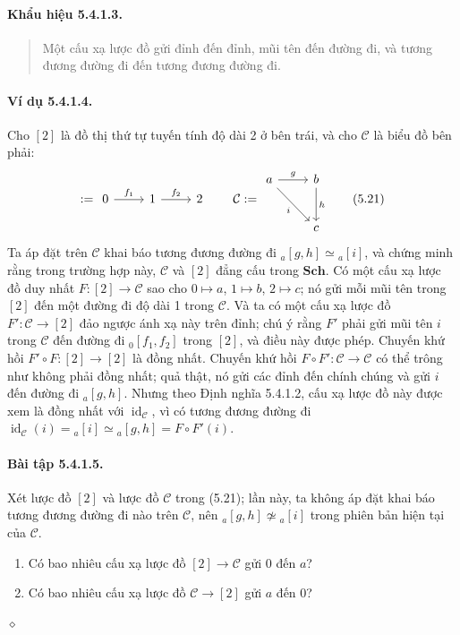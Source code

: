 \paragraph{Khẩu hiệu 5.4.1.3.}\begin{quote}Một cấu xạ lược đồ gửi đỉnh đến đỉnh, mũi tên đến đường đi, và tương đương đường đi đến tương đương đường đi.\end{quote}
\paragraph{Ví dụ 5.4.1.4.} Cho $[2]$ là đồ thị thứ tự tuyến tính độ dài 2 ở bên trái, và cho $\mathcal C$ là biểu đồ bên phải:
\begin{equation*}[2]:=\begin{tikzcd}0\arrow[r,"f_1"]&1\arrow[r,"f_2"]&2\end{tikzcd}\qquad\mathcal C:=\begin{tikzcd}[row sep=large]a\arrow[r,"g"]\arrow[dr,"i"']&b\arrow[d,"h"]\\&c\end{tikzcd}\tag{5.21}\end{equation*}
Ta áp đặt trên $\mathcal C$ khai báo tương đương đường đi ${}_{a}[g,h]\simeq {}_{a}[i]$, và chứng minh rằng trong trường hợp này, $\mathcal C$ và $[2]$ đẳng cấu trong $\mathbf{Sch}$. Có một cấu xạ lược đồ duy nhất $F:[2]\to\mathcal C$ sao cho $0\mapsto a$, $1\mapsto b$, $2\mapsto c$; nó gửi mỗi mũi tên trong $[2]$ đến một đường đi độ dài 1 trong $\mathcal C$. Và ta có một cấu xạ lược đồ $F':\mathcal C\to[2]$ đảo ngược ánh xạ này trên đỉnh; chú ý rằng $F'$ phải gửi mũi tên $i$ trong $\mathcal C$ đến đường đi ${}_{0}[f_1,f_2]$ trong $[2]$, và điều này được phép. Chuyến khứ hồi $F'\circ F:[2]\to[2]$ là đồng nhất. Chuyến khứ hồi $F\circ F':\mathcal C\to\mathcal C$ có thể trông như không phải đồng nhất; quả thật, nó gửi các đỉnh đến chính chúng và gửi $i$ đến đường đi ${}_{a}[g,h]$. Nhưng theo Định nghĩa 5.4.1.2, cấu xạ lược đồ này được xem là đồng nhất với $\operatorname{id}_{\mathcal C}$, vì có tương đương đường đi $\operatorname{id}_{\mathcal C}(i)={}_{a}[i]\simeq {}_{a}[g,h]=F\circ F'(i)$.
\paragraph{Bài tập 5.4.1.5.} Xét lược đồ $[2]$ và lược đồ $\mathcal C$ trong (5.21); lần này, ta không áp đặt khai báo tương đương đường đi nào trên $\mathcal C$, nên ${}_{a}[g,h]\not\simeq {}_{a}[i]$ trong phiên bản hiện tại của $\mathcal C$.
\begin{enumerate}[label=\alph*.]\item Có bao nhiêu cấu xạ lược đồ $[2]\to\mathcal C$ gửi 0 đến $a$?\item Có bao nhiêu cấu xạ lược đồ $\mathcal C\to[2]$ gửi $a$ đến 0?\end{enumerate}\hfill$\diamond$
